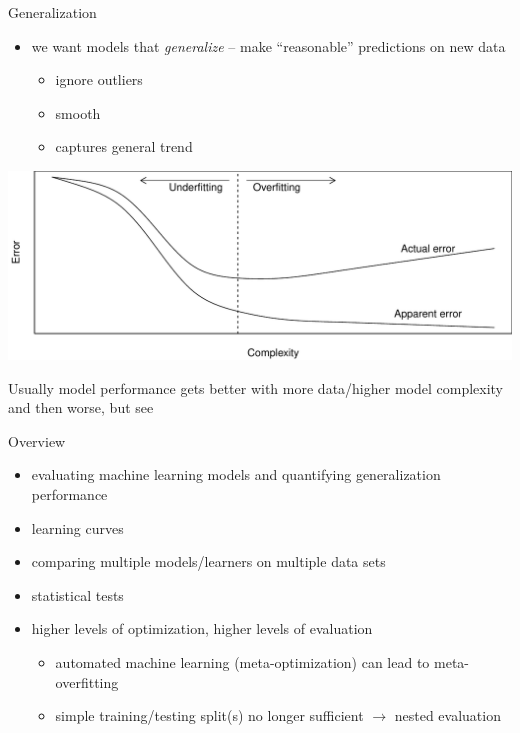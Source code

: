\begin{frame}[c]{Generalization}
    \begin{itemize}
        \item we want models that \emph{generalize} -- make ``reasonable''
            predictions on new data
            \begin{itemize}
                \item ignore outliers
                \item smooth
                \item captures general trend
            \end{itemize}
    \end{itemize}
    \begin{center}
        \includegraphics[width=.5\textwidth]{overfitting}
    \end{center}
    Usually model performance gets better with more data/higher model complexity
    and then worse, but see %
\end{frame}

\begin{frame}[c]{Overview}
    \begin{itemize}
        \item evaluating machine learning models and quantifying generalization
            performance
        \item learning curves
        \item comparing multiple models/learners on multiple data sets
        \item statistical tests
        \item higher levels of optimization, higher levels of evaluation
            \begin{itemize}
                \item automated machine learning (meta-optimization) can lead to
                    meta-overfitting
                \item simple training/testing split(s) no longer sufficient
                    $\rightarrow$ nested evaluation
            \end{itemize}
    \end{itemize}
\end{frame}

